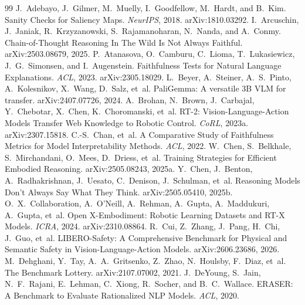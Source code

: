 \begin{thebibliography}{99}
 J.~Adebayo, J.~Gilmer, M.~Muelly, I.~Goodfellow, M.~Hardt, and B.~Kim. Sanity Checks for Saliency Maps. \emph{NeurIPS}, 2018. arXiv:1810.03292.
 I.~Arcuschin, J.~Janiak, R.~Krzyzanowski, S.~Rajamanoharan, N.~Nanda, and A.~Conmy. Chain-of-Thought Reasoning In The Wild Is Not Always Faithful. arXiv:2503.08679, 2025.
 P.~Atanasova, O.~Camburu, C.~Lioma, T.~Lukasiewicz, J.~G.~Simonsen, and I.~Augenstein. Faithfulness Tests for Natural Language Explanations. \emph{ACL}, 2023. arXiv:2305.18029.
 L.~Beyer, A.~Steiner, A.~S.~Pinto, A.~Kolesnikov, X.~Wang, D.~Salz, et~al. PaliGemma: A versatile 3B VLM for transfer. arXiv:2407.07726, 2024.
 A.~Brohan, N.~Brown, J.~Carbajal, Y.~Chebotar, X.~Chen, K.~Choromanski, et~al. RT-2: Vision-Language-Action Models Transfer Web Knowledge to Robotic Control. \emph{CoRL}, 2023a. arXiv:2307.15818.
 C.-S.~Chan, et~al. A Comparative Study of Faithfulness Metrics for Model Interpretability Methods. \emph{ACL}, 2022.
 W.~Chen, S.~Belkhale, S.~Mirchandani, O.~Mees, D.~Driess, et~al. Training Strategies for Efficient Embodied Reasoning. arXiv:2505.08243, 2025a.
 Y.~Chen, J.~Benton, A.~Radhakrishnan, J.~Uesato, C.~Denison, J.~Schulman, et~al. Reasoning Models Don't Always Say What They Think. arXiv:2505.05410, 2025b.
 O.~X.~Collaboration, A.~O'Neill, A.~Rehman, A.~Gupta, A.~Maddukuri, A.~Gupta, et~al. Open X-Embodiment: Robotic Learning Datasets and RT-X Models. \emph{ICRA}, 2024. arXiv:2310.08864.
 R.~Cui, Z.~Zhang, J.~Pang, H.~Chi, J.~Guo, et~al. {LIBERO-Safety}: A Comprehensive Benchmark for Physical and Semantic Safety in Vision-Language-Action Models. arXiv:2606.23686, 2026.
 M.~Dehghani, Y.~Tay, A.~A.~Gritsenko, Z.~Zhao, N.~Houlsby, F.~Diaz, et~al. The Benchmark Lottery. arXiv:2107.07002, 2021.
 J.~DeYoung, S.~Jain, N.~F.~Rajani, E.~Lehman, C.~Xiong, R.~Socher, and B.~C.~Wallace. {ERASER}: A Benchmark to Evaluate Rationalized NLP Models. \emph{ACL}, 2020.

\end{thebibliography}
